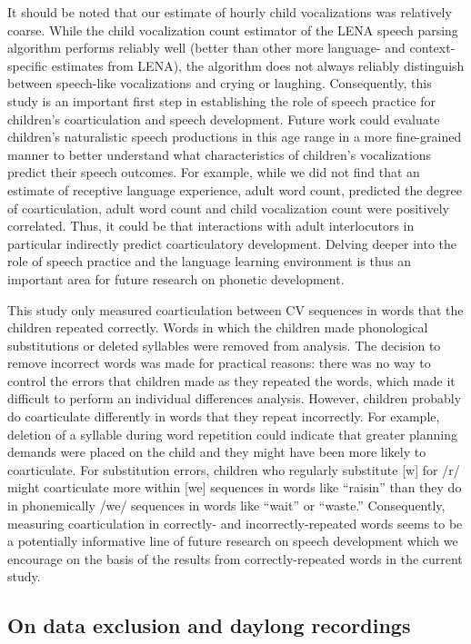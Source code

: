 \documentclass[a4paper,man,natbib,donotrepeattitle, apacite]{apa6}
\begin{document}
It should be noted that our estimate of hourly child vocalizations was relatively coarse. While the child vocalization count estimator of the LENA speech parsing algorithm performs reliably well \cite{cristiaThoroughEvaluationLanguage2020} (better than other more language- and context-specific estimates from LENA), the algorithm does not always reliably distinguish between speech-like vocalizations and crying or laughing. Consequently, this study is an important first step in establishing the role of speech practice for children’s coarticulation and speech development. Future work could evaluate children’s naturalistic speech productions in this age range in a more fine-grained manner to better understand what characteristics of children’s vocalizations predict their speech outcomes. For example, while we did not find that an estimate of receptive language experience, adult word count, predicted the degree of coarticulation, adult word count and child vocalization count were positively correlated. Thus, it could be that interactions with adult interlocutors in particular indirectly predict coarticulatory development. Delving deeper into the role of speech practice and the language learning environment is thus an important area for future research on phonetic development. 

This study only measured coarticulation between CV sequences in words that the children repeated correctly. Words in which the children made phonological substitutions or deleted syllables were removed from analysis. The decision to remove incorrect words was made for practical reasons: there was no way to control the errors that children made as they repeated the words, which made it difficult to perform an individual differences analysis. However, children probably do coarticulate differently in words that they repeat incorrectly. For example, deletion of a syllable during word repetition could indicate that greater planning demands were placed on the child and they might have been more likely to coarticulate. For substitution errors, children who regularly substitute [w] for /r/ might coarticulate more within [we] sequences in words like ``raisin'' than they do in phonemically /we/ sequences in words like ``wait'' or ``waste.'' Consequently, measuring coarticulation in correctly- and incorrectly-repeated words seems to be a potentially informative line of future research on speech development which we encourage on the basis of the results from correctly-repeated words in the current study. 

\subsection{On data exclusion and daylong recordings}
\end{document}
